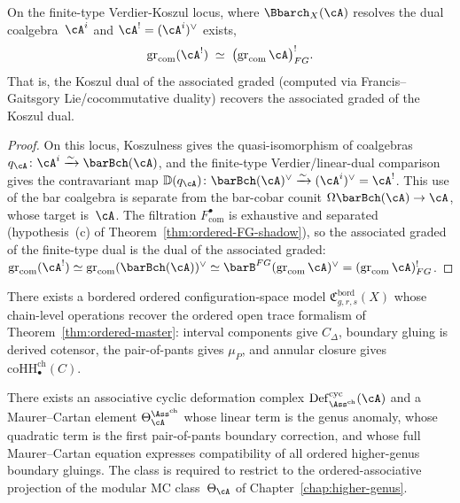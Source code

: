 \begin{corollary}
\label{cor:ordered-FG-koszul-locus}
On the finite-type Verdier-Koszul locus, where
$\Bbarch_X(\cA)$ resolves the dual coalgebra~$\cA^i$ and
$\cA^!=(\cA^i)^\vee$ exists,
\[
 \operatorname{gr}_{\mathrm{com}}(\cA^!)
 \;\simeq\;
 \bigl(\operatorname{gr}_{\mathrm{com}} \cA\bigr)^!_{FG}.
\]
That is, the Koszul dual of the associated graded (computed via
Francis--Gaitsgory Lie/cocommutative duality) recovers the
associated graded of the Koszul dual.
\end{corollary}

\begin{proof}
On this locus, Koszulness gives the quasi-isomorphism of coalgebras
$q_\cA\colon\cA^i\xrightarrow{\sim}\barBch(\cA)$, and the finite-type
Verdier/linear-dual comparison gives the contravariant map
$\mathbb D(q_\cA)\colon\barBch(\cA)^\vee\xrightarrow{\sim}
(\cA^i)^\vee=\cA^!$.  This use of the bar
coalgebra is separate from the bar-cobar counit
$\Omega\barBch(\cA)\to\cA$, whose target is~$\cA$.
The filtration $F_{\mathrm{com}}^\bullet$ is exhaustive and
separated (hypothesis~(c) of
Theorem~\ref{thm:ordered-FG-shadow}), so the associated graded of the
finite-type dual is the dual of the associated graded:
$\operatorname{gr}_{\mathrm{com}}(\cA^!)
\simeq\operatorname{gr}_{\mathrm{com}}(\barBch(\cA))^\vee
\simeq\barB^{FG}(\operatorname{gr}_{\mathrm{com}}\cA)^\vee
=(\operatorname{gr}_{\mathrm{com}}\cA)^!_{FG}$.
\end{proof}

\begin{conjecture}
\label{conj:ordered-bordered}
There exists a bordered ordered configuration-space model
$\mathfrak{C}^{\mathrm{bord}}_{g,r,s}(X)$ whose chain-level
operations recover the ordered open trace formalism of
Theorem~\textup{\ref{thm:ordered-master}}: interval components give
$C_\Delta$, boundary gluing is derived cotensor, the pair-of-pants
gives $\mu_P$, and annular closure gives
$\mathrm{coHH}^{\mathrm{ch}}_\bullet(C)$.
\end{conjecture}

\begin{conjecture}
\label{conj:ordered-modular-MC}
There exists an associative cyclic deformation complex
$\mathrm{Def}^{\mathrm{cyc}}_{\Ass^{\mathrm{ch}}}(\cA)$
and a Maurer--Cartan element
$\Theta_\cA^{\Ass^{\mathrm{ch}}}$ whose linear term is the
genus anomaly, whose quadratic term is the first pair-of-pants
boundary correction, and whose full Maurer--Cartan equation
expresses compatibility of all ordered higher-genus boundary
gluings.  The class is required to restrict to the
ordered-associative projection of the modular MC class~$\Theta_\cA$
of Chapter~\textup{\ref{chap:higher-genus}}.
\end{conjecture}

